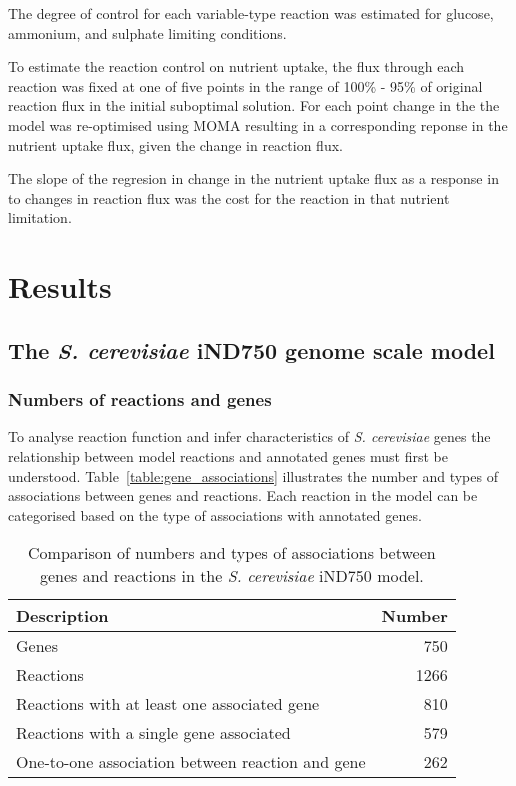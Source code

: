 The degree of control for each variable-type reaction was estimated for glucose, ammonium, and sulphate limiting conditions.

To estimate the reaction control on nutrient uptake, the flux through each reaction was fixed at one of five points in the range of 100\% - 95\% of original reaction flux in the initial suboptimal solution. For each point change in the the model was re-optimised using MOMA resulting in a corresponding reponse in the nutrient uptake flux, given the change in reaction flux.

The slope of the regresion in change in the nutrient uptake flux as a response in to changes in reaction flux was the cost for the reaction in that nutrient limitation.


\clearpage

\section{Results}%

\subsection{The \emph{S. cerevisiae} iND750 genome scale model}%

\subsubsection{Numbers of reactions and genes}%

To analyse reaction function and infer characteristics of \emph{S. cerevisiae} genes the relationship between model reactions and annotated genes must first be understood. Table~\vref{table:gene_associations} illustrates the number and types of associations between genes and reactions. Each reaction in the model can be categorised based on the type of associations with annotated genes.

\begin{table}[b]%
  \centering
  \begin{tabular}{l r}
                                                                   \toprule
    Description                                      & Number   \\ \midrule
    Genes                                            & 750      \\
    Reactions                                        & 1266     \\
    Reactions with at least one associated gene      & 810      \\
    Reactions with a single gene associated          & 579      \\
    One-to-one association between reaction and gene & 262      \\ \bottomrule
  \end{tabular}
  \caption[Gene associations in the \emph{S. cerevisiae} iND750 model]{Comparison of numbers and types of associations between genes and reactions in the \emph{S. cerevisiae} iND750 model. }
  \label{table:gene_associations}
\end{table}%

